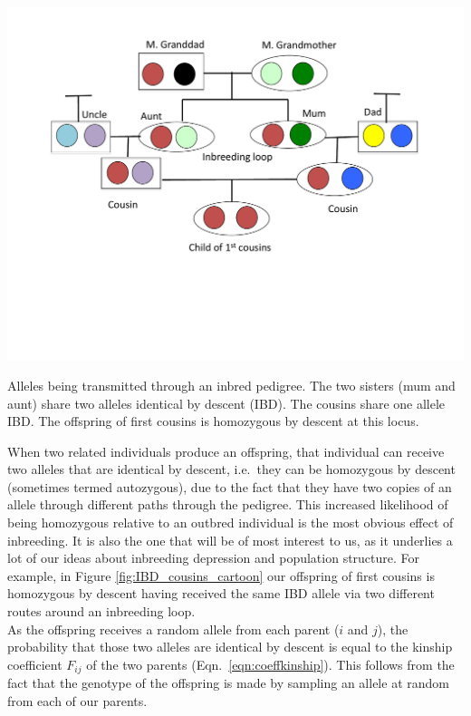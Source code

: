 {{\begin{marginfigure}
\begin{center}
\includegraphics[width= \textwidth]{figures/Child_first_cousins_Homozy_BD.pdf}
\end{center}
\caption{Alleles being transmitted through an inbred pedigree. The two sisters (mum and aunt) share two alleles identical by descent (IBD). The cousins share one
  allele IBD. The offspring of first cousins is homozygous by
  descent at this locus.} \label{fig:IBD_cousins_cartoon}
\end{marginfigure}
When two related individuals produce an offspring, that individual can
receive two alleles that are identical by descent, i.e.\ they
can be homozygous by descent (sometimes termed autozygous), due to the
fact that they have two copies of an allele through different paths
through the pedigree.  This increased likelihood of being homozygous
relative to an outbred individual is the most obvious effect of
inbreeding. It is also the one that will be of most interest to us, as it
underlies a lot of our ideas about inbreeding depression and
population structure. For example, in Figure \ref{fig:IBD_cousins_cartoon} our
offspring of first cousins is homozygous by descent having received
the same IBD allele via two different routes around an inbreeding loop.\\

As the offspring receives a random allele from each parent ($i$ and $j$), the
probability that those two alleles are identical by descent is equal to the
kinship coefficient $F_{ij}$ of the two parents (Eqn.\ \ref{eqn:coeffkinship}). This follows from the fact that
the genotype of the offspring is made by sampling an allele at random from each
of our parents. %

}}
